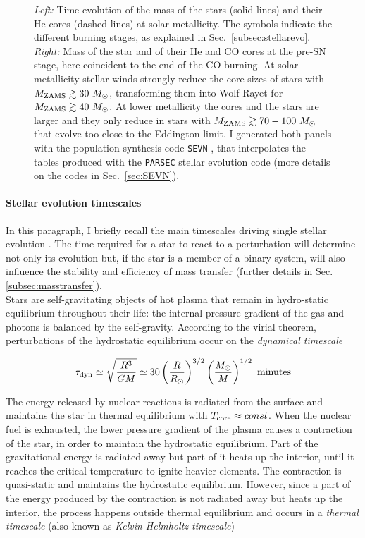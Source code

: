 \documentclass[a4paper,titlepage]{book}     	%
\newcommand{\sun}{\ensuremath{_\odot}}
\newcommand{\mzams}{M_\textup{ZAMS}}
\newcommand{\msun}{\ensuremath{M\sun}}
\begin{document}
\begin{figure}[h!]
\begin{minipage}{.49\textwidth}
	\end{minipage}
	\caption{\emph{Left:} Time evolution of the mass of the stars (solid lines) and their He cores (dashed lines) at solar metallicity. The symbols indicate the different burning stages, as explained in Sec.\ \ref{subsec:stellarevo}. \emph{Right:} Mass of the star and of their He and CO cores at the pre-SN stage, here coincident to the end of the CO burning. At solar metallicity stellar winds strongly reduce the core sizes of stars with $\mzams \gtrsim 30 ~\msun$, transforming them into Wolf-Rayet for $\mzams \gtrsim 40 ~\msun$. At lower metallicity the cores and the stars are larger and they only reduce in stars with $\mzams \gtrsim 70-100 ~\msun$ that evolve too close to the Eddington limit. I generated both panels with the population-synthesis code \texttt{SEVN} \cite{spera2019_mergingBBH}, that interpolates the tables produced with the \texttt{PARSEC} stellar evolution code \cite{parsec2015_chen} (more details on the codes in Sec.\ \ref{sec:SEVN}).}\label{fig:masslostWR}
\end{figure}



\paragraph{Stellar evolution timescales} In this paragraph, I briefly recall the main timescales driving single stellar evolution \cite{evostellare}. The time required for a star to react to a perturbation will determine not only its evolution but, if the star is a member of a binary system, will also influence the stability and efficiency of mass transfer (further details in Sec. \ref{subsec:masstransfer}). \\

Stars are self-gravitating objects of hot plasma that remain in hydro-static equilibrium throughout their life: the internal pressure gradient of the gas and photons is balanced by the self-gravity. According to the virial theorem, perturbations of the hydrostatic equilibrium occur on the \emph{dynamical timescale}

\begin{equation}\label{eq:taudyn}
\tau_\textup{dyn} \simeq \sqrt{\frac{R^3}{G M}} \simeq 30 \left(\frac{R}{R\sun}\right)^{3/2} \left(\frac{M\sun}{M}\right)^{1/2}\ \text{minutes}
\end{equation}


The energy released by nuclear reactions is radiated from the surface and maintains the star in thermal equilibrium with $T_{\rm core} \approx const$. When the nuclear fuel is exhausted, the lower pressure gradient of the plasma causes a contraction of the star, in order to maintain the hydrostatic equilibrium. Part of the gravitational energy is radiated away but part of it heats up the interior, until it reaches the critical temperature to ignite heavier elements. The contraction is quasi-static and maintains the hydrostatic equilibrium. However, since a part of the energy produced by the contraction is not radiated away but heats up the interior, the process happens outside thermal equilibrium and occurs in a \emph{thermal timescale} (also known as \emph{Kelvin-Helmholtz timescale})
\end{document}
